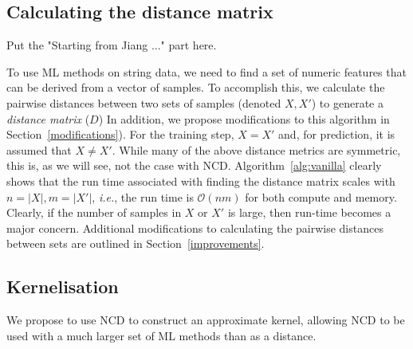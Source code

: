 \documentclass[preprint,12pt]{article}
\begin{document}

% 


\subsection{Calculating the distance matrix}
\label{distance_matrix}

Put the "Starting from Jiang ..." part here.

To use ML methods on string data, we need to find a set of numeric features that can be derived from a vector of samples.
To accomplish this, we calculate the pairwise distances between two sets of samples (denoted $X, X'$) to generate a \textit{distance matrix} ($D$) 
In addition, we propose modifications to this algorithm in Section~\ref{modifications}).
For the training step, $X = X'$ and, for prediction, it is assumed that $X \neq X'$.
While many of the above distance metrics are symmetric, this is, as we will see, not the case with NCD.
Algorithm~\ref{alg:vanilla} clearly shows that the run time associated with finding the distance matrix scales with $n = | X |, m = | X' |$, \textit{i.e.}, the run time is $\mathcal{O}(nm)$ for both compute and memory.
Clearly, if the number of samples in $X$ or $X'$ is large, then run-time becomes a major concern.
Additional modifications to calculating the pairwise distances between sets are outlined in Section~\ref{improvements}.






\subsection{Kernelisation}
\label{kernels}

We propose to use NCD to construct an approximate kernel, allowing NCD to be used with a much larger set of ML methods than as a distance.
\end{document}
